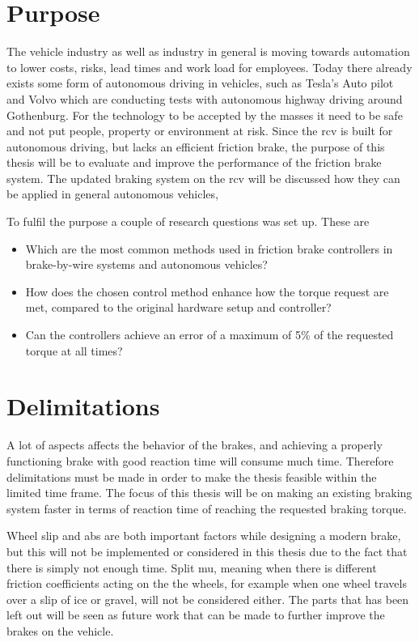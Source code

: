 \documentclass[a4paper,11pt]{kth-mag}
\begin{document}
\section{Purpose}
The vehicle industry as well as industry in general is moving towards automation to lower costs, risks, lead times and work load for employees. Today there already exists some form of autonomous driving in vehicles, such as Tesla's Auto pilot and Volvo which are conducting tests with autonomous highway driving around Gothenburg. For the technology to be accepted by the masses it need to be safe and not put people, property or environment at risk. Since the \gls{rcv} is built for autonomous driving, but lacks an efficient friction brake, the purpose of this thesis will be to evaluate and improve the performance of the friction brake system. The updated braking system on the \gls{rcv} will be discussed how they can be applied in general autonomous vehicles, 

To fulfil the purpose a couple of research questions was set up. These are 
\begin{itemize}
\item Which are the most common methods used in friction brake controllers in brake-by-wire systems and autonomous vehicles? 
\item How does the chosen control method enhance how the torque request are met, compared to the original hardware setup and controller?
\item Can the controllers achieve an error of a maximum of 5\% of the requested torque at all times?
\end{itemize}

\section{Delimitations}
A lot of aspects affects the behavior of the brakes, and  achieving a properly functioning brake with good reaction time will consume much time. Therefore delimitations must be made in order to make the thesis feasible within the limited time frame. The focus of this thesis will be on making an existing braking system faster in terms of reaction time of reaching the requested braking torque. 

Wheel slip and \gls{abs} are both important factors while designing a modern brake, but this will not be implemented or considered in this thesis due to the fact that there is simply not enough time. Split mu, meaning when there is different friction coefficients acting on the the wheels, for example when one wheel travels over a slip of ice or gravel, will not be considered either. The parts that has been left out will be seen as future work that can be made to further improve the brakes on the vehicle. 
\end{document}
